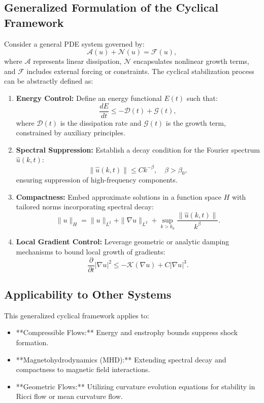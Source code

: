 \documentclass[12pt]{article}
\begin{document}
\subsection{Generalized Formulation of the Cyclical Framework}
Consider a general PDE system governed by:
\begin{equation}
\mathcal{A}(u) + \mathcal{N}(u) = \mathcal{F}(u),
\end{equation}
where $\mathcal{A}$ represents linear dissipation, $\mathcal{N}$ encapsulates nonlinear growth terms, and $\mathcal{F}$ includes external forcing or constraints. The cyclical stabilization process can be abstractly defined as:
\begin{enumerate}
    \item \textbf{Energy Control:} Define an energy functional $E(t)$ such that:
    \begin{equation}
    \frac{dE}{dt} \leq -\mathcal{D}(t) + \mathcal{G}(t),
    \end{equation}
    where $\mathcal{D}(t)$ is the dissipation rate and $\mathcal{G}(t)$ is the growth term, constrained by auxiliary principles.
    \item \textbf{Spectral Suppression:} Establish a decay condition for the Fourier spectrum $\hat{u}(k, t)$:
    \begin{equation}
    \|\hat{u}(k, t)\| \leq Ck^{-\beta}, \quad \beta > \beta_0,
    \end{equation}
    ensuring suppression of high-frequency components.
    \item \textbf{Compactness:} Embed approximate solutions in a function space $H$ with tailored norms incorporating spectral decay:
    \begin{equation}
    \|u\|_H = \|u\|_{L^2} + \|\nabla u\|_{L^2} + \sup_{k > k_0} \frac{\|\hat{u}(k, t)\|}{k^\beta}.
    \end{equation}
    \item \textbf{Local Gradient Control:} Leverage geometric or analytic damping mechanisms to bound local growth of gradients:
    \begin{equation}
    \frac{\partial}{\partial t} |\nabla u|^2 \leq -\mathcal{K}(\nabla u) + C|\nabla u|^3.
    \end{equation}
\end{enumerate}
\subsection{Applicability to Other Systems}
This generalized cyclical framework applies to:
\begin{itemize}
    \item **Compressible Flows:** Energy and enstrophy bounds suppress shock formation.
    \item **Magnetohydrodynamics (MHD):** Extending spectral decay and compactness to magnetic field interactions.
    \item **Geometric Flows:** Utilizing curvature evolution equations for stability in Ricci flow or mean curvature flow.
\end{itemize}
\end{document}
